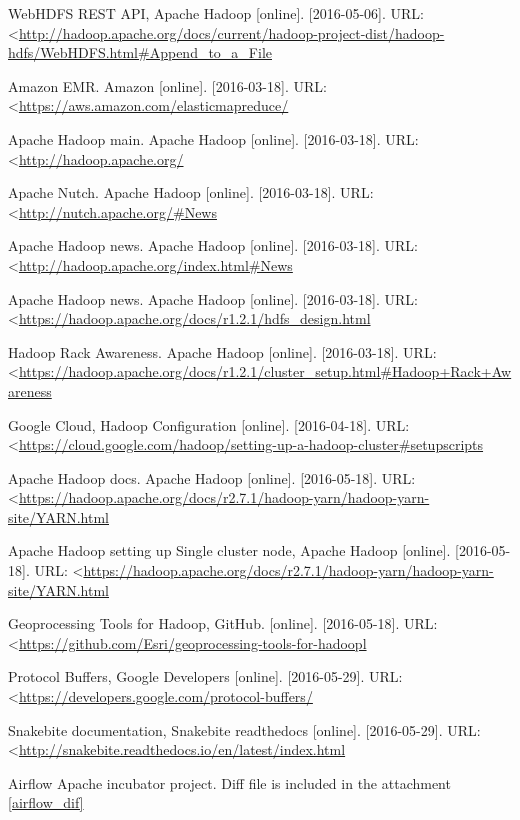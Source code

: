 \documentclass[a4paper,12pt,oneside]{report}
\begin{document}
\begin{thebibliography}{99}
WebHDFS REST API, Apache Hadoop  [online]. [2016-05-06]. URL:  \textless\url{http://hadoop.apache.org/docs/current/hadoop-project-dist/hadoop-hdfs/WebHDFS.html#Append_to_a_File
}

Amazon EMR. Amazon [online]. [2016-03-18]. 
URL: \textless\url{https://aws.amazon.com/elasticmapreduce/}

Apache Hadoop main. Apache Hadoop [online]. [2016-03-18]. 
URL: \textless\url{http://hadoop.apache.org/}

Apache Nutch. Apache Hadoop [online]. [2016-03-18]. 
URL: \textless\url{http://nutch.apache.org/#News
}

Apache Hadoop news. Apache Hadoop [online]. [2016-03-18]. 
URL: \textless\url{http://hadoop.apache.org/index.html#News}


Apache Hadoop news. Apache Hadoop [online]. [2016-03-18]. 
URL: \textless\url{https://hadoop.apache.org/docs/r1.2.1/hdfs_design.html}


Hadoop Rack Awareness. Apache Hadoop [online]. [2016-03-18]. 
URL: \textless\url{https://hadoop.apache.org/docs/r1.2.1/cluster_setup.html#Hadoop+Rack+Awareness}

Google Cloud, Hadoop Configuration [online]. [2016-04-18]. 
URL: \textless\url{https://cloud.google.com/hadoop/setting-up-a-hadoop-cluster#setupscripts}

Apache Hadoop docs. Apache Hadoop [online]. [2016-05-18]. 
URL: \textless\url{https://hadoop.apache.org/docs/r2.7.1/hadoop-yarn/hadoop-yarn-site/YARN.html}

Apache Hadoop setting up Single cluster node, Apache Hadoop [online]. [2016-05-18]. 
URL: \textless\url{https://hadoop.apache.org/docs/r2.7.1/hadoop-yarn/hadoop-yarn-site/YARN.html}


Geoprocessing Tools for Hadoop, GitHub. [online]. [2016-05-18]. 
URL: \textless\url{https://github.com/Esri/geoprocessing-tools-for-hadoopl}

Protocol Buffers, Google Developers [online]. [2016-05-29]. 
URL: \textless\url{https://developers.google.com/protocol-buffers/}

Snakebite documentation, Snakebite readthedocs [online]. [2016-05-29]. 
URL: \textless\url{http://snakebite.readthedocs.io/en/latest/index.html
}




Airflow Apache incubator project. Diff file is included in the attachment \ref{airflow_dif}



\end{thebibliography}
\end{document}
